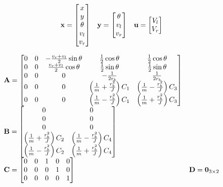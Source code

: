 \begin{theorem}
  \label{thm:linearized_diff_drive_model}
  \begin{equation*}
    \begin{array}{ccc}
      \mathbf{x} =
      \begin{bmatrix}
        x \\
        y \\
        \theta \\
        v_l \\
        v_r
      \end{bmatrix} &
      \mathbf{y} =
      \begin{bmatrix}
        \theta \\
        v_l \\
        v_r
      \end{bmatrix} &
      \mathbf{u} =
      \begin{bmatrix}
        V_l \\
        V_r
      \end{bmatrix}
    \end{array}
  \end{equation*}

  \begin{equation}
    \begin{array}{ll}
      \mathbf{A} =
      \begin{bmatrix}
        0 & 0 & -\frac{v_r + v_l}{2}\sin\theta & \frac{1}{2}\cos\theta &
          \frac{1}{2}\cos\theta \\
        0 & 0 & \frac{v_r + v_l}{2}\cos\theta & \frac{1}{2}\sin\theta &
          \frac{1}{2}\sin\theta \\
        0 & 0 & 0 & -\frac{1}{2r_b} & \frac{1}{2r_b} \\
        0 & 0 & 0 & \left(\frac{1}{m} + \frac{r_b^2}{J}\right) C_1 &
          \left(\frac{1}{m} - \frac{r_b^2}{J}\right) C_3 \\
        0 & 0 & 0 & \left(\frac{1}{m} - \frac{r_b^2}{J}\right) C_1 &
          \left(\frac{1}{m} + \frac{r_b^2}{J}\right) C_3
      \end{bmatrix} \\
      \mathbf{B} =
      \begin{bmatrix}
        0 & 0 \\
        0 & 0 \\
        0 & 0 \\
        \left(\frac{1}{m} + \frac{r_b^2}{J}\right) C_2 &
        \left(\frac{1}{m} - \frac{r_b^2}{J}\right) C_4 \\
        \left(\frac{1}{m} - \frac{r_b^2}{J}\right) C_2 &
        \left(\frac{1}{m} + \frac{r_b^2}{J}\right) C_4
      \end{bmatrix} \\
      \mathbf{C} =
      \begin{bmatrix}
        0 & 0 & 1 & 0 & 0 \\
        0 & 0 & 0 & 1 & 0 \\
        0 & 0 & 0 & 0 & 1
      \end{bmatrix} &
      \mathbf{D} = \mathbf{0}_{3 \times 2}
    \end{array}
  \end{equation}


\end{theorem}
